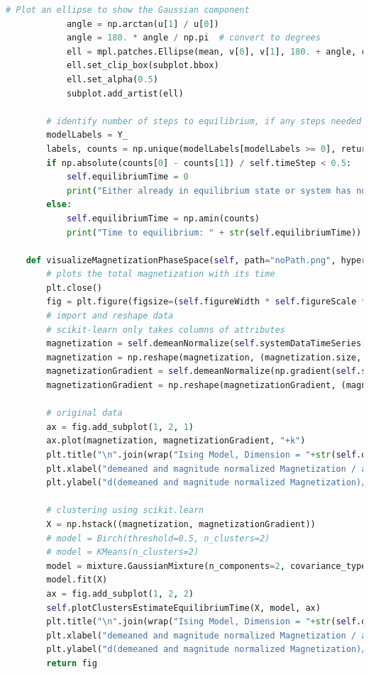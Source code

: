 \documentclass[%
showkeys,
bibnotes,
amsmath,amssymb,
floatfix,
]{revtex4-1}
\begin{document}
\begin{lstlisting}[language=Python]
            # Plot an ellipse to show the Gaussian component
            angle = np.arctan(u[1] / u[0])
            angle = 180. * angle / np.pi  # convert to degrees
            ell = mpl.patches.Ellipse(mean, v[0], v[1], 180. + angle, color=color)
            ell.set_clip_box(subplot.bbox)
            ell.set_alpha(0.5)
            subplot.add_artist(ell)

        # identify number of steps to equilibrium, if any steps needed at all
        modelLabels = Y_
        labels, counts = np.unique(modelLabels[modelLabels >= 0], return_counts=True)
        if np.absolute(counts[0] - counts[1]) / self.timeStep < 0.5:
            self.equilibriumTime = 0
            print("Either already in equilibrium state or system has not reached equilibrium. \nEquilibrium time defaults to 0.")
        else:
            self.equilibriumTime = np.amin(counts)
            print("Time to equilibrium: " + str(self.equilibriumTime))

    def visualizeMagnetizationPhaseSpace(self, path="noPath.png", hyperplane=None):
        # plots the total magnetization with its time
        plt.close()
        fig = plt.figure(figsize=(self.figureWidth * self.figureScale * 2, self.figureHeight * self.figureScale), dpi=self.figureDpi)
        # import and reshape data
        # scikit-learn only takes columns of attributes
        magnetization = self.demeanNormalize(self.systemDataTimeSeries[1])
        magnetization = np.reshape(magnetization, (magnetization.size, 1))
        magnetizationGradient = self.demeanNormalize(np.gradient(self.systemDataTimeSeries[1]))
        magnetizationGradient = np.reshape(magnetizationGradient, (magnetizationGradient.size, 1))

        # original data
        ax = fig.add_subplot(1, 2, 1)
        ax.plot(magnetization, magnetizationGradient, "+k")
        plt.title("\n".join(wrap("Ising Model, Dimension = "+str(self.d)+", N = "+str(self.n)+", Tc = "+str(sigfig.round(float(self.tc), sigfigs=4))+"K, T = "+str(sigfig.round(float(self.t), sigfigs=4)) + "K, Time = "+str(self.timeStep)+"au", 60)))
        plt.xlabel("demeaned and magnitude normalized Magnetization / a.u.")
        plt.ylabel("d(demeaned and magnitude normalized Magnetization)/dt / a.u.")

        # clustering using scikit.learn
        X = np.hstack((magnetization, magnetizationGradient))
        # model = Birch(threshold=0.5, n_clusters=2)
        # model = KMeans(n_clusters=2)
        model = mixture.GaussianMixture(n_components=2, covariance_type='full')
        model.fit(X)
        ax = fig.add_subplot(1, 2, 2)
        self.plotClustersEstimateEquilibriumTime(X, model, ax)
        plt.title("\n".join(wrap("Ising Model, Dimension = "+str(self.d)+", N = "+str(self.n)+", Tc = "+str(sigfig.round(float(self.tc), sigfigs=4))+"K, T = "+str(sigfig.round(float(self.t), sigfigs=4)) + "K, Time = "+str(self.timeStep)+"au", 60)))
        plt.xlabel("demeaned and magnitude normalized Magnetization / a.u.")
        plt.ylabel("d(demeaned and magnitude normalized Magnetization)/dt / a.u.")
        return fig


\end{lstlisting}
\end{document}
